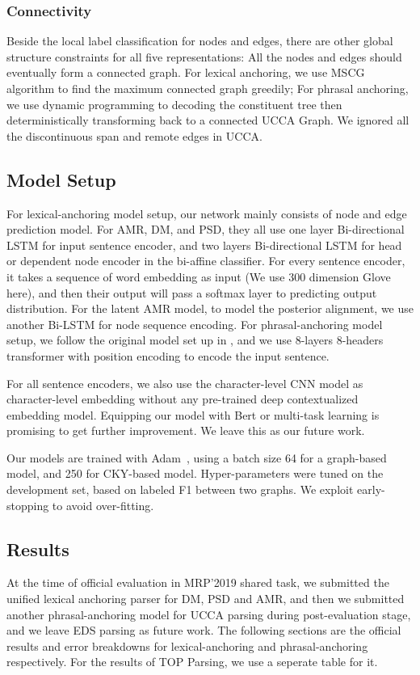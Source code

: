 \subsubsection{Connectivity}
\label{sssec:lex:connectivity}

Beside the local label classification for nodes and edges, there are
other global structure constraints for all five representations: All the nodes and
edges should eventually form a connected graph. For lexical anchoring,
we use MSCG algorithm to find the maximum connected graph greedily;
For phrasal anchoring, we use dynamic programming to decoding the
constituent tree then deterministically transforming back to a
connected UCCA Graph. We ignored all the discontinuous span and remote
edges in UCCA.

\subsection{Model Setup}
\label{ssec:exp_setup}

For lexical-anchoring model setup, our network mainly consists of node
and edge prediction model. For AMR, DM, and PSD, they all use one
layer Bi-directional LSTM for input sentence encoder, and two layers
Bi-directional LSTM for head or dependent node encoder in the
bi-affine classifier. For every sentence encoder, it takes a sequence
of word embedding as input (We use 300 dimension Glove here), and then
their output will pass a softmax layer to predicting output
distribution. For the latent AMR model, to model the posterior
alignment, we use another Bi-LSTM for node sequence encoding. For
phrasal-anchoring model setup, we follow the original model set up in
\citet{kitaev2018constituency}, and we use 8-layers 8-headers
transformer with position encoding to encode the input sentence.

For all sentence encoders, we also use the character-level CNN model
as character-level embedding without any pre-trained deep
contextualized embedding model. Equipping our model with Bert or
multi-task learning is promising to get further improvement. We leave
this as our future work.

Our models are trained with Adam~\cite{kingma2014adam}, using a batch
size 64 for a graph-based model, and 250 for CKY-based
model. Hyper-parameters were tuned on the development set, based on
labeled F1 between two graphs. We exploit early-stopping to avoid
over-fitting.

\subsection{Results}
\label{ssec:results}
At the time of official evaluation in MRP'2019 shared task, we
submitted the unified lexical anchoring parser for DM, PSD and AMR,
and then we submitted another phrasal-anchoring model for UCCA parsing
during post-evaluation stage, and we leave EDS parsing as future
work. The following sections are the official results and error
breakdowns for lexical-anchoring and phrasal-anchoring
respectively. For the results of TOP Parsing, we use a seperate table
for it.

